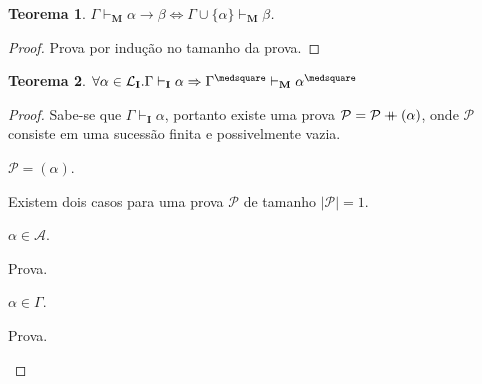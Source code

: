 \documentclass{report}
\newcommand\mdoubleplus{\mathbin{+\mkern-10mu+}}
\newtheorem{theorem}{Teorema}
\begin{document}
    \begin{theorem}
        $\Gamma\vdash_\mathbf{M}\alpha\to\beta\Leftrightarrow\Gamma\cup\{\alpha\}\vdash_\mathbf{M}\beta$.
    \end{theorem}

    \begin{proof}
        Prova por indução no tamanho da prova.
    \end{proof}

    \begin{theorem}
        $\forall \alpha \in \mathcal{L}_\mathbf{I} . \Gamma \vdash_\mathbf{I} \alpha \Rightarrow \Gamma^\medsquare \vdash_\mathbf{M} \alpha^\medsquare$
    \end{theorem}

    \begin{proof}
        Sabe-se que $\Gamma \vdash_\mathbf{I} \alpha$, portanto existe uma prova $\mathcal{P} = \mathcal{P} \mdoubleplus (\alpha)$, onde $\mathcal{P}$ consiste em uma sucessão finita e possivelmente vazia.

        \begin{case}
            \item{$\mathcal{P} = (\alpha)$}.
                
                Existem dois casos para uma prova $\mathcal{P}$ de tamanho $|\mathcal{P}| = 1$.

            \begin{subcase}
                \item{$\alpha\in\mathcal{A}$}.
                    
                    Prova.

                \item{$\alpha\in\Gamma$}.
                    
                    Prova.
            \end{subcase}
        \end{case}
    \end{proof}

    

\end{document}
